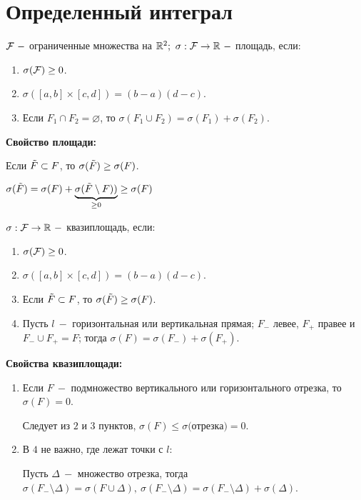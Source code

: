 \section{Определенный интеграл}

\begin{definition}
    $\mathcal{F}\ -$ ограниченные множества на $\mathbb{R}^2;\ \sigma:\mathcal{F}\rightarrow \mathbb{R}\ -$ площадь, если:
    \begin{enumerate}
        \item $\sigma(\mathcal{F})\geq 0$.
        \item $\sigma([a,b]\times[c,d])=(b-a)(d-c)$.
        \item Если $F_1\cap F_2=\varnothing$, то $\sigma(F_1\cup F_2)=\sigma(F_1)+\sigma(F_2)$.
    \end{enumerate}
\end{definition}

\begin{statement} \textbf{Свойство площади:}

    Если $\Tilde{F}\subset F$, то $\sigma(\Tilde{F})\geq \sigma(F)$.

    $\sigma(\Tilde{F})=\sigma(F)+\underbrace{\sigma(\Tilde{F}\setminus F))}_{\geq 0}\geq \sigma(F)$
\end{statement}

\begin{definition}
    $\sigma:\mathcal{F}\rightarrow \mathbb{R}\ -$ квазиплощадь, если:
    \begin{enumerate}
        \item $\sigma(\mathcal{F})\geq 0$.
        \item $\sigma([a,b]\times[c,d])=(b-a)(d-c)$.
        \item Если $\Tilde{F}\subset F$, то $\sigma(\Tilde{F})\geq \sigma(F)$.
        \item Пусть $l\ -$ горизонтальная или вертикальная прямая; $F_-$ левее, $F_+$ правее и $F_-\cup F_+=F$; тогда $\sigma(F)=\sigma(F_-)+\sigma(F_+)$.
    \end{enumerate}
\end{definition}

\begin{statement} \textbf{Свойства квазиплощади:}

    \begin{enumerate}
        \item Если $F\ -$ подмножество вертикального или горизонтального отрезка, то $\sigma(F)=0$.

        Следует из $2$ и $3$ пунктов, $\sigma(F)\leq \sigma($отрезка$)=0$.

        \item В $4$ не важно, где лежат точки с $l$:

        Пусть $\Delta\ -$ множество отрезка, тогда $\sigma(F_-\setminus \Delta)=\sigma (F\cup \Delta),\ \sigma(F_-\setminus \Delta)=\sigma(F_-\setminus \Delta)+\sigma(\Delta)$.
    \end{enumerate}
\end{statement}

